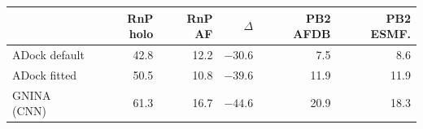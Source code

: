 \begin{tabular}{@{}lrrrrr@{}}
\toprule
 & RnP holo & RnP AF & $\Delta$ & PB2 AFDB & PB2 ESMF. \\
\midrule
ADock default & 42.8 & 12.2 & $-30.6$ & 7.5 & 8.6 \\
ADock fitted & 50.5 & 10.8 & $-39.6$ & 11.9 & 11.9 \\
GNINA (CNN) & 61.3 & 16.7 & $-44.6$ & 20.9 & 18.3 \\
\bottomrule
\end{tabular}
